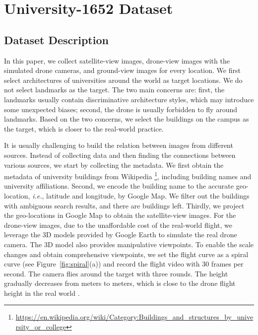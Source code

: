 \documentclass[sigconf]{acmart}
\def\ie{\emph{i.e.}}
\begin{document}
\section{University-1652 Dataset} \label{sec:dataset}
\subsection{Dataset Description}
In this paper, we collect  satellite-view images, drone-view images with the simulated drone cameras, and ground-view images for every location. We first select  architectures of  universities around the world as target locations. We do not select landmarks as the target. The two main concerns are: first, the landmarks usually contain discriminative architecture styles, which may introduce some unexpected biases; second, the drone is usually forbidden to fly around landmarks. Based on the two concerns, we select the buildings on the campus as the target, which is closer to the real-world practice. 

It is usually challenging to build the relation between images from different sources. Instead of collecting data and then finding the connections between various sources, we start by collecting the metadata. We first obtain the metadata of university buildings from Wikipedia \footnote{\url{https://en.wikipedia.org/wiki/Category:Buildings_and_structures_by_university_or_college}}, including building names and university affiliations. Second, we encode the building name to the accurate geo-location, \ie, latitude and longitude, by Google Map. We filter out the buildings with ambiguous search results, and there are  buildings left. 
Thirdly, we project the geo-locations in Google Map to obtain the satellite-view images. For the drone-view images, due to the unaffordable cost of the real-world flight, we leverage the 3D models provided by Google Earth to simulate the real drone camera. The 3D model also provides manipulative viewpoints. To enable the scale changes and obtain comprehensive viewpoints, we set the flight curve as a spiral curve (see Figure~\ref{fig:spiral}(a)) and record the flight video with 30 frames per second. The camera flies around the target with three rounds. The height gradually decreases from  meters to  meters, which is close to the drone flight height in the real world \cite{rule2015airspace, brar2015drones}.
\end{document}
